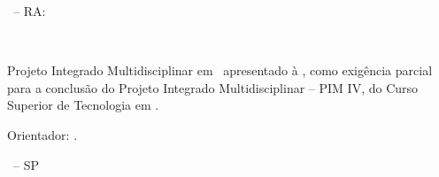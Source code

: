 \thispagestyle{empty}

\begin{center}
    {\large \MakeUppercase{\autorNome\ -- RA: \autorRA}}

    \vspace{4cm}

    {\large \textbf{\MakeUppercase{\tituloTrabalho}}} \\[0.3cm]
    {\large \subtituloTrabalho}
\end{center}

\vspace{3cm}

\begin{flushright}
    \begin{minipage}[c]{0.6\textwidth}
        \SingleSpacing
        Projeto Integrado Multidisciplinar em \curso\
        apresentado à \nomeUniversidade, como exigência parcial
        para a conclusão do Projeto Integrado Multidisciplinar -- PIM IV,
        do Curso Superior de Tecnologia em \curso.

        \vspace{0.5cm}
        Orientador: \orientadorNome.
    \end{minipage}
\end{flushright}

\vfill

\begin{center}
    \cidade\ -- SP \\
    \ano
\end{center}
